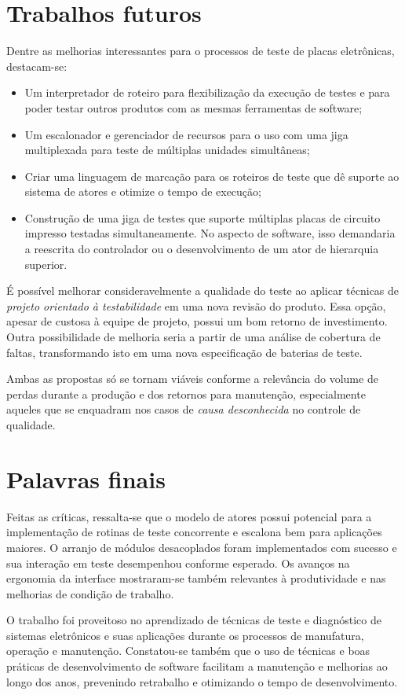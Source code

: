     \section{Trabalhos futuros}          
    Dentre as melhorias interessantes para o processos de teste de placas eletrônicas, destacam-se:
    \begin{itemize}
            
        \item Um interpretador de roteiro para flexibilização da execução de testes e para poder testar outros produtos com as mesmas ferramentas de software;
        
        \item Um escalonador e gerenciador de recursos para o uso com uma jiga multiplexada para teste de múltiplas unidades simultâneas;
        
        \item  Criar uma linguagem de marcação para os roteiros de teste que dê suporte ao sistema de atores e otimize o tempo de execução;

        \item Construção de uma jiga de testes que suporte múltiplas placas de circuito impresso testadas simultaneamente. No aspecto de software, isso demandaria a reescrita do controlador ou o desenvolvimento de um ator de hierarquia superior.
    \end{itemize}
    
    É possível melhorar consideravelmente a qualidade do teste ao aplicar técnicas de \textit{projeto orientado à testabilidade} em uma nova revisão do produto. Essa opção, apesar de custosa à equipe de projeto, possui um bom retorno de investimento. Outra possibilidade de melhoria seria a partir de uma análise de cobertura de faltas, transformando isto em uma nova especificação de baterias de teste. 
    
    Ambas as propostas só se tornam viáveis conforme a relevância do volume de perdas durante a produção e dos retornos para manutenção, especialmente aqueles que se enquadram nos casos de \textit{causa desconhecida} no controle de qualidade.
        
    \section{Palavras finais}
    
    Feitas as críticas, ressalta-se que o modelo de atores possui potencial para a implementação de rotinas de teste concorrente e escalona bem para aplicações maiores. O arranjo de módulos desacoplados foram implementados com sucesso e sua interação em teste desempenhou conforme esperado. Os avanços na ergonomia da interface mostraram-se também relevantes à produtividade e nas melhorias de condição de trabalho.
    
    O trabalho foi proveitoso no aprendizado de técnicas de teste e diagnóstico de sistemas eletrônicos e suas aplicações durante os processos de manufatura, operação e manutenção. Constatou-se também que o uso de técnicas e boas práticas de desenvolvimento de software facilitam a manutenção e melhorias ao longo dos anos, prevenindo retrabalho e otimizando o tempo de desenvolvimento.
    